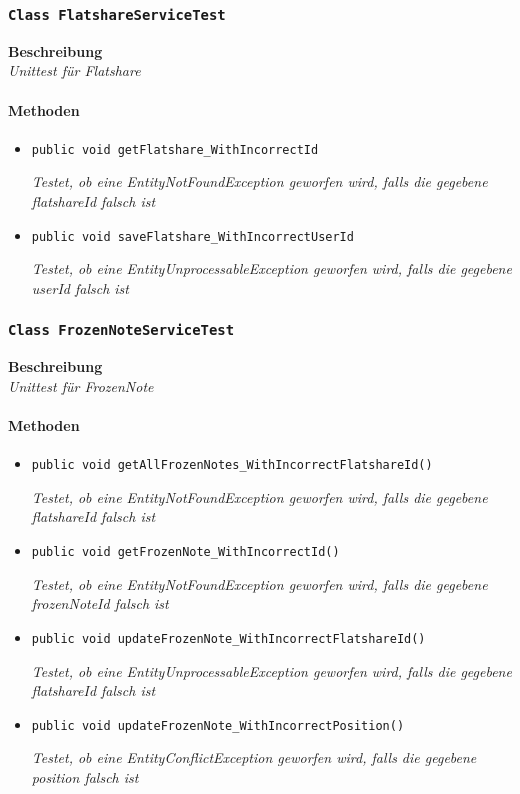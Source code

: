  \subsubsection{\texttt{Class FlatshareServiceTest}}
 \textbf{Beschreibung} \\
 \textit{Unittest für Flatshare}
 \paragraph*{Methoden}
 \begin{itemize}
    	\item{\texttt{public void getFlatshare\_WithIncorrectId}}
    	
    	\textit{Testet, ob eine EntityNotFoundException geworfen wird, falls die gegebene flatshareId falsch ist}
    	
    	\item{\texttt{public void saveFlatshare\_WithIncorrectUserId}}
    	
    	\textit{Testet, ob eine EntityUnprocessableException geworfen wird, falls die gegebene userId falsch ist}
 \end{itemize}
 
 \subsubsection{\texttt{Class FrozenNoteServiceTest}}
 \textbf{Beschreibung} \\
 \textit{Unittest für FrozenNote}
 \paragraph*{Methoden}
 \begin{itemize}
    	\item{\texttt{public void getAllFrozenNotes\_WithIncorrectFlatshareId()}}
    	
    	\textit{Testet, ob eine EntityNotFoundException geworfen wird, falls die gegebene flatshareId falsch ist}
    	
    	\item{\texttt{public void getFrozenNote\_WithIncorrectId()}}
    	
    	\textit{Testet, ob eine EntityNotFoundException geworfen wird, falls die gegebene frozenNoteId falsch ist}
    	
    	\item{\texttt{public void updateFrozenNote\_WithIncorrectFlatshareId()}}
    	
    	\textit{Testet, ob eine EntityUnprocessableException geworfen wird, falls die gegebene flatshareId falsch ist}

    	\item{\texttt{public void updateFrozenNote\_WithIncorrectPosition()}}
    	
    	\textit{Testet, ob eine EntityConflictException geworfen wird, falls die gegebene position falsch ist}
 \end{itemize}
 
